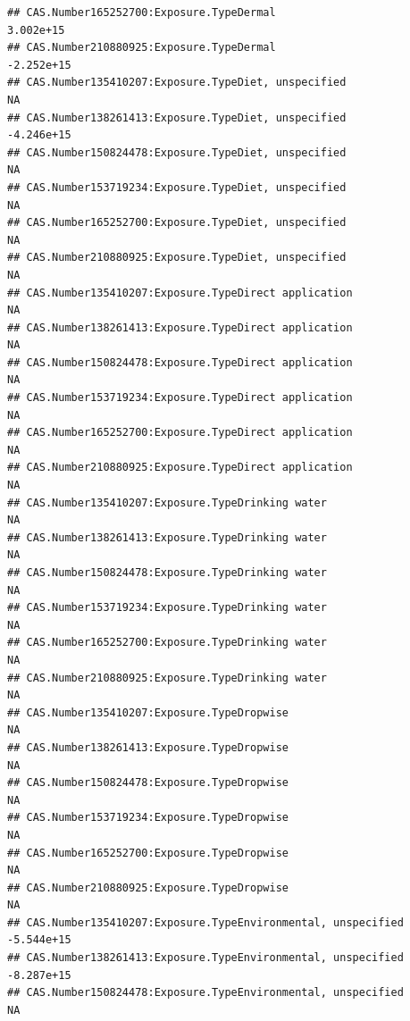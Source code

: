 \documentclass[
  12pt,
]{article}
\begin{document}
\begin{verbatim}
## CAS.Number165252700:Exposure.TypeDermal                                      3.002e+15
## CAS.Number210880925:Exposure.TypeDermal                                     -2.252e+15
## CAS.Number135410207:Exposure.TypeDiet, unspecified                                  NA
## CAS.Number138261413:Exposure.TypeDiet, unspecified                          -4.246e+15
## CAS.Number150824478:Exposure.TypeDiet, unspecified                                  NA
## CAS.Number153719234:Exposure.TypeDiet, unspecified                                  NA
## CAS.Number165252700:Exposure.TypeDiet, unspecified                                  NA
## CAS.Number210880925:Exposure.TypeDiet, unspecified                                  NA
## CAS.Number135410207:Exposure.TypeDirect application                                 NA
## CAS.Number138261413:Exposure.TypeDirect application                                 NA
## CAS.Number150824478:Exposure.TypeDirect application                                 NA
## CAS.Number153719234:Exposure.TypeDirect application                                 NA
## CAS.Number165252700:Exposure.TypeDirect application                                 NA
## CAS.Number210880925:Exposure.TypeDirect application                                 NA
## CAS.Number135410207:Exposure.TypeDrinking water                                     NA
## CAS.Number138261413:Exposure.TypeDrinking water                                     NA
## CAS.Number150824478:Exposure.TypeDrinking water                                     NA
## CAS.Number153719234:Exposure.TypeDrinking water                                     NA
## CAS.Number165252700:Exposure.TypeDrinking water                                     NA
## CAS.Number210880925:Exposure.TypeDrinking water                                     NA
## CAS.Number135410207:Exposure.TypeDropwise                                           NA
## CAS.Number138261413:Exposure.TypeDropwise                                           NA
## CAS.Number150824478:Exposure.TypeDropwise                                           NA
## CAS.Number153719234:Exposure.TypeDropwise                                           NA
## CAS.Number165252700:Exposure.TypeDropwise                                           NA
## CAS.Number210880925:Exposure.TypeDropwise                                           NA
## CAS.Number135410207:Exposure.TypeEnvironmental, unspecified                 -5.544e+15
## CAS.Number138261413:Exposure.TypeEnvironmental, unspecified                 -8.287e+15
## CAS.Number150824478:Exposure.TypeEnvironmental, unspecified                         NA

\end{verbatim}
\end{document}
